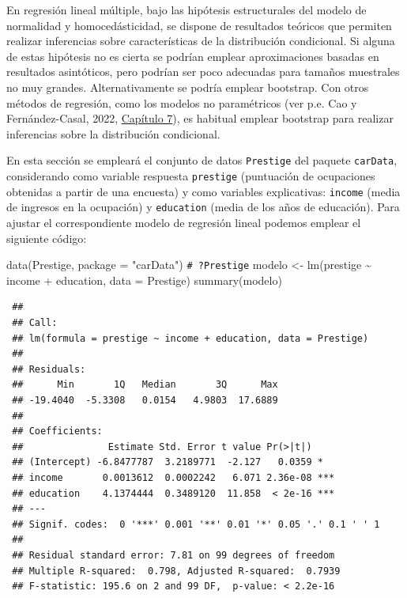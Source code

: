 \documentclass[
]{book}
\newenvironment{Shaded}{\begin{snugshade}}{\end{snugshade}}
\newcommand{\AttributeTok}[1]{\textcolor[rgb]{0.77,0.63,0.00}{#1}}
\newcommand{\CommentTok}[1]{\textcolor[rgb]{0.56,0.35,0.01}{\textit{#1}}}
\newcommand{\FunctionTok}[1]{\textcolor[rgb]{0.00,0.00,0.00}{#1}}
\newcommand{\NormalTok}[1]{#1}
\newcommand{\OtherTok}[1]{\textcolor[rgb]{0.56,0.35,0.01}{#1}}
\newcommand{\SpecialCharTok}[1]{\textcolor[rgb]{0.00,0.00,0.00}{#1}}
\newcommand{\StringTok}[1]{\textcolor[rgb]{0.31,0.60,0.02}{#1}}
\theoremstyle{break}
\theoremstyle{nonumberplain}
\renewcommand{\CommentTok}[1]{\textcolor[rgb]{0.41,0.41,0.41}{\texttt{#1}}}
\begin{document}
En regresión lineal múltiple, bajo las hipótesis estructurales del modelo de normalidad y homocedásticidad, se dispone de resultados teóricos que permiten realizar inferencias sobre características de la distribución condicional. Si alguna de estas hipótesis no es cierta se podrían emplear aproximaciones basadas en resultados asintóticos, pero podrían ser poco adecuadas para tamaños muestrales no muy grandes. Alternativamente se podría emplear bootstrap.
Con otros métodos de regresión, como los modelos no paramétricos (ver p.e. Cao y Fernández-Casal, 2022, \href{https://rubenfcasal.github.io/book_remuestreo/m\%C3\%A9todos-de-remuestreo-en-regresi\%C3\%B3n-no-param\%C3\%A9trica.html}{Capítulo 7}), es habitual emplear bootstrap para realizar inferencias sobre la distribución condicional.

En esta sección se empleará el conjunto de datos \texttt{Prestige} del paquete \texttt{carData}, considerando como variable respuesta \texttt{prestige} (puntuación de ocupaciones obtenidas a partir de una encuesta) y como variables explicativas: \texttt{income} (media de ingresos en la ocupación) y \texttt{education} (media de los años de educación).
Para ajustar el correspondiente modelo de regresión lineal podemos emplear el siguiente código:

\begin{Shaded}
\begin{Highlighting}[]
\FunctionTok{data}\NormalTok{(Prestige, }\AttributeTok{package =} \StringTok{"carData"}\NormalTok{)}
\CommentTok{\# ?Prestige}
\NormalTok{modelo }\OtherTok{\textless{}{-}} \FunctionTok{lm}\NormalTok{(prestige }\SpecialCharTok{\textasciitilde{}}\NormalTok{ income }\SpecialCharTok{+}\NormalTok{ education, }\AttributeTok{data =}\NormalTok{ Prestige)}
\FunctionTok{summary}\NormalTok{(modelo)}
\end{Highlighting}
\end{Shaded}

\begin{verbatim}
 ## 
 ## Call:
 ## lm(formula = prestige ~ income + education, data = Prestige)
 ## 
 ## Residuals:
 ##      Min       1Q   Median       3Q      Max 
 ## -19.4040  -5.3308   0.0154   4.9803  17.6889 
 ## 
 ## Coefficients:
 ##               Estimate Std. Error t value Pr(>|t|)    
 ## (Intercept) -6.8477787  3.2189771  -2.127   0.0359 *  
 ## income       0.0013612  0.0002242   6.071 2.36e-08 ***
 ## education    4.1374444  0.3489120  11.858  < 2e-16 ***
 ## ---
 ## Signif. codes:  0 '***' 0.001 '**' 0.01 '*' 0.05 '.' 0.1 ' ' 1
 ## 
 ## Residual standard error: 7.81 on 99 degrees of freedom
 ## Multiple R-squared:  0.798, Adjusted R-squared:  0.7939 
 ## F-statistic: 195.6 on 2 and 99 DF,  p-value: < 2.2e-16
\end{verbatim}
\end{document}
